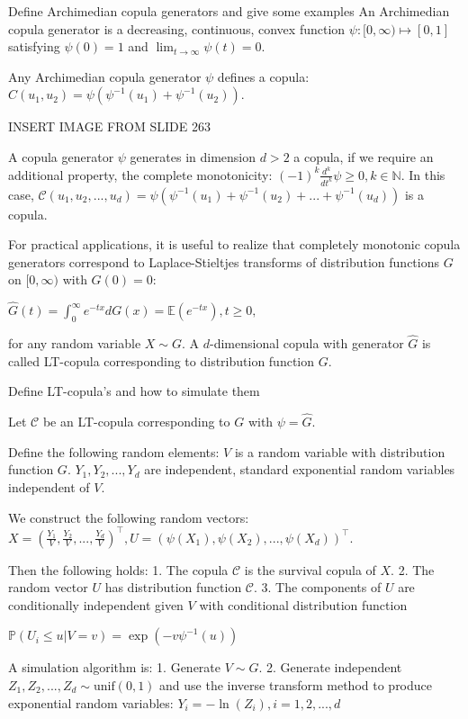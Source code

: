 Define Archimedian copula generators and give some examples
An Archimedian copula generator is a decreasing, continuous, convex function \(\psi: [0, \infty) \mapsto [0, 1]\) 
satisfying \(\psi(0) = 1\) and \(\lim_{t \rightarrow \infty} \psi(t) = 0\).

Any Archimedian copula generator \(\psi\) defines a copula:
\(C(u_1, u_2) = \psi(\psi^{-1}(u_1) + \psi^{-1}(u_2))\).

INSERT IMAGE FROM SLIDE 263


A copula generator \(\psi\) generates in dimension \(d > 2\) a copula, if we require an additional property, the complete monotonicity:
\((-1)^k \frac{d^k}{dt^k} \psi \ge 0, k \in \mathbb{N}.\)
In this case,
\(\mathcal{C}(u_1, u_2, ..., u_d) = \psi(\psi^{-1}(u_1) + \psi^{-1}(u_2) + ... + \psi^{-1}(u_d))\)
is a copula.

For practical applications, it is useful to realize that completely monotonic copula generators correspond 
to Laplace-Stieltjes transforms of distribution functions \(G\) on \([0, \infty)\) with \(G(0) = 0\):

\(\hat{G}(t) = \int_0^\infty e^{-tx} dG(x) = \mathbb{E}(e^{-tx}), t \ge 0,\)

for any random variable \(X \sim G\).
A \(d\)-dimensional copula with generator \(\hat{G}\) is called LT-copula corresponding to distribution function \(G\).


Define LT-copula's and how to simulate them

Let \(\mathcal{C}\) be an LT-copula corresponding to \(G\) with \(\psi = \hat{G}\).

Define the following random elements:
\(V\) is a random variable with distribution function \(G\).
\(Y_1, Y_2, ..., Y_d\) are independent, standard exponential random variables independent of \(V\).

We construct the following random vectors:
\(X = (\frac{Y_1}{V}, \frac{Y_2}{V}, ..., \frac{Y_d}{V})^\top, U = (\psi(X_1), \psi(X_2), ..., \psi(X_d))^\top\).

Then the following holds:
1. The copula \(\mathcal{C}\) is the survival copula of \(X\).
2. The random vector \(U\) has distribution function \(\mathcal{C}\).
3. The components of \(U\) are conditionally independent given \(V\) with conditional distribution function

\(\mathbb{P}(U_i \le u | V = v) = \exp(-v \psi^{-1}(u))\)
 
A simulation algorithm is:
1. Generate \(V \sim G\).
2. Generate independent
    \(Z_1, Z_2, ..., Z_d \sim \text{unif}(0, 1)\)
    and use the inverse transform method to produce exponential random variables:
    \(Y_i = -\ln(Z_i), i = 1, 2, ..., d\)

